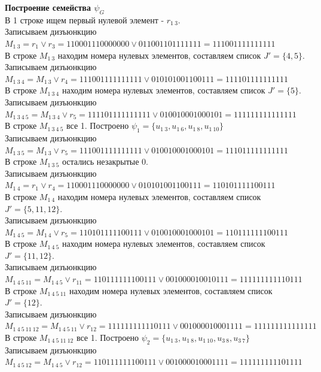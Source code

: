 \documentclass[a4paper,12pt]{article}
\begin{document}
{ \large \centering \textbf{Построение семейства $\psi_G$} \\ }
\noindent
В 1 строке ищем первый нулевой элемент - $r_{1\ 3}$.\\
Записываем дизъюнкцию $M_{1\ 3} = r_{1}\lor r_{3} = 110001110000000 \lor 011001101111111 = 111001111111111$\\
В строке $M_{1\ 3}$ находим номера нулевых элементов, составляем список $J' = \{4, 5\}$.\\
Записываем дизъюнкцию $M_{1\ 3\ 4} = M_{1\ 3}\lor r_{4} = 111001111111111 \lor 010101001100111 = 111101111111111$\\
В строке $M_{1\ 3\ 4}$ находим номера нулевых элементов, составляем список $J' = \{5\}$.\\
Записываем дизъюнкцию $M_{1\ 3\ 4\ 5} = M_{1\ 3\ 4}\lor r_{5} = 111101111111111 \lor 010010001000101 = 111111111111111$\\
В строке $M_{1\ 3\ 4\ 5}$ все 1. Построено $\psi_{1} = \{u_{1\ 3},u_{1\ 6},u_{1\ 8},u_{1\ 10}\}$\\
Записываем дизъюнкцию $M_{1\ 3\ 5} = M_{1\ 3}\lor r_{5} = 111001111111111 \lor 010010001000101 = 111011111111111$\\
В строке $M_{1\ 3\ 5}$ остались незакрытые 0.\\
Записываем дизъюнкцию $M_{1\ 4} = r_{1}\lor r_{4} = 110001110000000 \lor 010101001100111 = 110101111100111$\\
В строке $M_{1\ 4}$ находим номера нулевых элементов, составляем список $J' = \{5, 11, 12\}$.\\
Записываем дизъюнкцию $M_{1\ 4\ 5} = M_{1\ 4}\lor r_{5} = 110101111100111 \lor 010010001000101 = 110111111100111$\\
В строке $M_{1\ 4\ 5}$ находим номера нулевых элементов, составляем список $J' = \{11, 12\}$.\\
Записываем дизъюнкцию $M_{1\ 4\ 5\ 11} = M_{1\ 4\ 5}\lor r_{11} = 110111111100111 \lor 001000010010111 = 111111111110111$\\
В строке $M_{1\ 4\ 5\ 11}$ находим номера нулевых элементов, составляем список $J' = \{12\}$.\\
Записываем дизъюнкцию $M_{1\ 4\ 5\ 11\ 12} = M_{1\ 4\ 5\ 11}\lor r_{12} = 111111111110111 \lor 001000010001111 = 111111111111111$\\
В строке $M_{1\ 4\ 5\ 11\ 12}$ все 1. Построено $\psi_{2} = \{u_{1\ 3},u_{1\ 8},u_{1\ 10},u_{3\ 8},u_{3\ 7}\}$\\
Записываем дизъюнкцию $M_{1\ 4\ 5\ 12} = M_{1\ 4\ 5}\lor r_{12} = 110111111100111 \lor 001000010001111 = 111111111101111$\\
\end{document}
